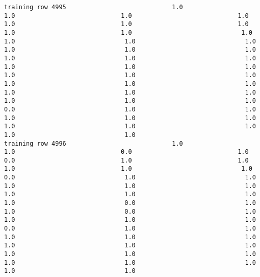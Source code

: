 \documentclass[11pt]{article}
\begin{document}
\begin{verbatim}
training row 4995                             1.0                             1.0                             1.0                             1.0                             1.0                             1.0                             1.0                             1.0                             1.0                              1.0                              1.0                              1.0                              1.0                              1.0                              1.0                              1.0                              1.0                              1.0                              1.0                              1.0                              1.0                              1.0                              1.0                              1.0                              1.0                              1.0                              1.0                              1.0                              1.0                              1.0                              1.0                              1.0                              1.0                              1.0                              0.0                              1.0                              1.0                              1.0                              1.0                              1.0                              1.0                              1.0                              1.0                              1.0                              1.0
training row 4996                             1.0                             1.0                             0.0                             1.0                             0.0                             1.0                             1.0                             1.0                             1.0                              1.0                              0.0                              1.0                              1.0                              1.0                              1.0                              1.0                              1.0                              1.0                              1.0                              1.0                              0.0                              1.0                              1.0                              0.0                              1.0                              1.0                              1.0                              1.0                              0.0                              1.0                              1.0                              1.0                              1.0                              1.0                              1.0                              1.0                              1.0                              1.0                              1.0                              1.0                              1.0                              1.0                              1.0                              1.0                              1.0

\end{verbatim}
\end{document}
